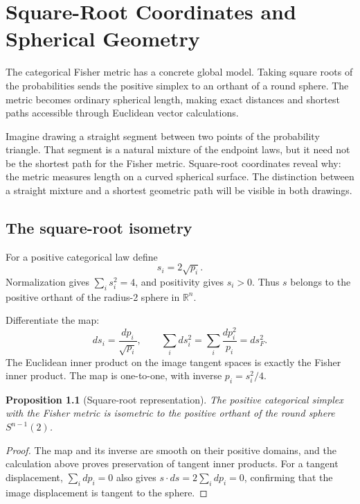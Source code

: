 \documentclass[11pt,oneside,openany]{book}
\newtheorem{proposition}[theorem]{Proposition}
\theoremstyle{definition}
\theoremstyle{remark}
\newcommand{\R}{\mathbb{R}}
\numberwithin{equation}{chapter}
\begin{document}
\chapter{Square-Root Coordinates and Spherical Geometry}
\label{ch:sphere}

The categorical Fisher metric has a concrete global model. Taking square roots of the probabilities sends the positive simplex to an orthant of a round sphere. The metric becomes ordinary spherical length, making exact distances and shortest paths accessible through Euclidean vector calculations.

Imagine drawing a straight segment between two points of the probability triangle. That segment is a natural mixture of the endpoint laws, but it need not be the shortest path for the Fisher metric. Square-root coordinates reveal why: the metric measures length on a curved spherical surface. The distinction between a straight mixture and a shortest geometric path will be visible in both drawings.

\section{The square-root isometry}
For a positive categorical law define
\begin{equation}\label{eq:sqrtmap}
s_i=2\sqrt{p_i}.
\end{equation}
Normalization gives $\sum_i s_i^2=4$, and positivity gives $s_i>0$. Thus $s$ belongs to the positive orthant of the radius-2 sphere in $\R^n$.

Differentiate the map:
\[
ds_i=\frac{dp_i}{\sqrt{p_i}},\qquad
\sum_i ds_i^2=\sum_i\frac{dp_i^2}{p_i}=ds_F^2.
\]
The Euclidean inner product on the image tangent spaces is exactly the Fisher inner product. The map is one-to-one, with inverse $p_i=s_i^2/4$.

\begin{proposition}[Square-root representation]
The positive categorical simplex with the Fisher metric is isometric to the positive orthant of the round sphere $S^{n-1}(2)$.
\end{proposition}
\begin{proof}
The map and its inverse are smooth on their positive domains, and the calculation above proves preservation of tangent inner products. For a tangent displacement, $\sum_i dp_i=0$ also gives $s\cdot ds=2\sum_i dp_i=0$, confirming that the image displacement is tangent to the sphere.
\end{proof}
\end{document}
